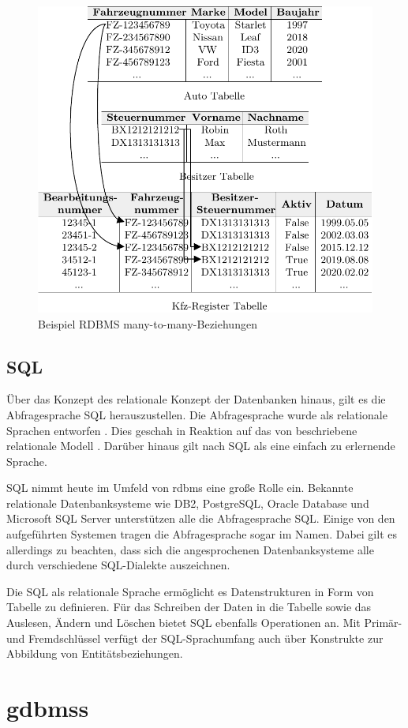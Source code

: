 \begin{figure}[h]
    \centering
    \includegraphics[width=\textwidth]{images/many-to-many.pdf}
    \caption{Beispiel RDBMS many-to-many-Beziehungen}
    \label{fig:rdbms_m2m}
\end{figure}

\subsection{SQL}
Über das Konzept des relationale Konzept der Datenbanken hinaus, gilt es die Abfragesprache SQL herauszustellen. Die Abfragesprache wurde als relationale Sprachen entworfen \cite{sql_history}. Dies geschah in Reaktion auf das von \citeauthor{codd_relational_model} beschriebene relationale Modell \cite{sql_history}. Darüber hinaus gilt nach \cite{sql_history} SQL als eine einfach zu erlernende Sprache. 

SQL nimmt heute im Umfeld von \acs{rdbms} eine große Rolle ein. Bekannte relationale Datenbanksysteme wie DB2, PostgreSQL, Oracle Database und Microsoft SQL Server unterstützen alle die Abfragesprache SQL. Einige von den aufgeführten Systemen tragen die Abfragesprache sogar im Namen. Dabei gilt es allerdings zu beachten, dass sich die angesprochenen Datenbanksysteme alle durch verschiedene SQL-Dialekte auszeichnen. 

Die SQL als relationale Sprache ermöglicht es Datenstrukturen in Form von Tabelle zu definieren. Für das Schreiben der Daten in die Tabelle sowie das Auslesen, Ändern und Löschen bietet SQL ebenfalls Operationen an. Mit Primär- und Fremdschlüssel verfügt der SQL-Sprachumfang auch über Konstrukte zur Abbildung von Entitätsbeziehungen. 

\section{\acl{gdbms}s}

